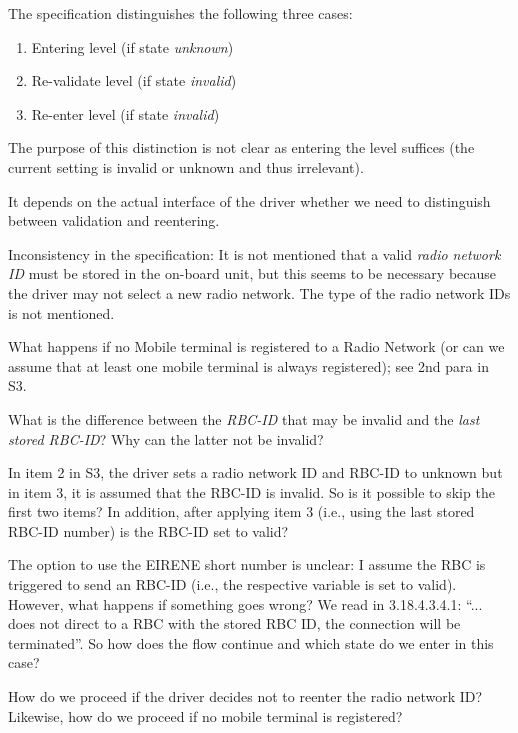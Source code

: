 \documentclass{template/openetcs_article}
\begin{document}
The specification distinguishes the following three cases:
\begin{enumerate}
   \item Entering level (if state \emph{unknown})
   \item Re-validate level (if state \emph{invalid})
   \item Re-enter level (if state \emph{invalid})
\end{enumerate}
The purpose of this distinction is not clear as entering the level suffices (the current setting is invalid or unknown and thus irrelevant).

\resolution It depends on the actual interface of the driver whether we need to distinguish between validation and reentering.

Inconsistency in the specification: It is not mentioned that a valid \emph{radio network ID} must be stored in the on-board unit, but this seems to be necessary because the driver may not select a new radio network. The type of the radio network IDs is not mentioned.

What happens if no Mobile terminal is registered to a Radio Network (or can we assume that at least one mobile terminal is always registered); see 2nd para in S3.

What is the difference between the \emph{RBC-ID} that may be invalid and the \emph{last stored RBC-ID}? Why can the latter not be invalid?



In item 2 in S3, the driver sets a radio network ID and RBC-ID to unknown but in item 3, it is assumed that the RBC-ID is invalid. So is it possible to skip the first two items? In addition, after applying item 3 (i.e., using the last stored RBC-ID number) is the RBC-ID set to valid?

The option to use the EIRENE short number is unclear: I assume the RBC is triggered to send an RBC-ID (i.e., the respective variable is set to valid). However, what happens if something goes wrong? We read in 3.18.4.3.4.1:  ``... does not direct to a RBC with the stored RBC ID, the connection will be terminated''. So how does the flow continue and which state do we enter in this case?

How do we proceed if the driver decides not to reenter the radio network ID? Likewise, how do we proceed if no mobile terminal is registered?
\end{document}

